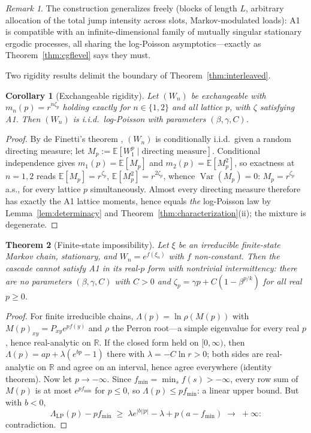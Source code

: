 \documentclass[12pt]{amsart}
\newtheorem{theorem}{Theorem}
\newtheorem{corollary}[theorem]{Corollary}
\theoremstyle{definition}
\theoremstyle{remark}
\newtheorem*{remark}{Remark}
\DeclareMathOperator{\Var}{Var}
\begin{document}
\begin{remark}
The construction generalizes freely (blocks of length $L$, arbitrary
allocation of the total jump intensity across slots,
Markov-modulated loads): A1 is compatible with an
infinite-dimensional family of mutually singular stationary ergodic
processes, all sharing the log-Poisson asymptotics---exactly as
Theorem~\ref{thm:cgflevel} says they must.
\end{remark}

Two rigidity results delimit the boundary of
Theorem~\ref{thm:interleaved}.

\begin{corollary}[Exchangeable rigidity]\label{cor:exch}
Let $(W_n)$ be exchangeable with $m_n(p) = r^{n\zeta_p}$ holding
exactly for $n \in \{1,2\}$ and all lattice $p$, with $\zeta$
satisfying A1.  Then $(W_n)$ is i.i.d.\ log-Poisson with parameters
$(\beta, \gamma, C)$.
\end{corollary}

\begin{proof}
By de Finetti's theorem \cite{Kal02}, $(W_n)$ is conditionally
i.i.d.\ given a random directing measure; let $M_p :=
\mathbb{E}[W_1^p \mid \text{directing measure}]$.  Conditional
independence gives $m_1(p) = \mathbb{E}[M_p]$ and $m_2(p) =
\mathbb{E}[M_p^2]$, so exactness at $n = 1,2$ reads
$\mathbb{E}[M_p] = r^{\zeta_p}$, $\mathbb{E}[M_p^2] =
r^{2\zeta_p}$, whence $\Var(M_p) = 0$: $M_p = r^{\zeta_p}$ a.s., for
every lattice $p$ simultaneously.  Almost every directing measure
therefore has exactly the A1 lattice moments, hence equals
\emph{the} log-Poisson law by Lemma~\ref{lem:determinacy} and
Theorem~\ref{thm:characterization}(ii); the mixture is degenerate.
\end{proof}

\begin{theorem}[Finite-state impossibility]\label{thm:finitestate}
Let $\xi$ be an irreducible finite-state Markov chain, stationary,
and $W_n = e^{f(\xi_n)}$ with $f$ non-constant.  Then the cascade
cannot satisfy A1 in its real-$p$ form with nontrivial
intermittency: there are no parameters $(\beta, \gamma, C)$ with
$C > 0$ and $\zeta_p = \gamma p + C(1-\beta^{p/k})$ for all real
$p \ge 0$.
\end{theorem}

\begin{proof}
For finite irreducible chains, $\Lambda(p) = \ln\rho(M(p))$ with
$M(p)_{xy} = P_{xy}e^{pf(y)}$ and $\rho$ the Perron root---a simple
eigenvalue for every real $p$, hence real-analytic on $\mathbb{R}$.
If the closed form held on $[0,\infty)$, then $\Lambda(p) = ap +
\lambda(e^{bp}-1)$ there with $\lambda = -C\ln r > 0$; both sides
are real-analytic on $\mathbb{R}$ and agree on an interval, hence
agree everywhere (identity theorem).  Now let $p \to -\infty$.
Since $f_{\min} = \min_s f(s) > -\infty$, every row sum of $M(p)$
is at most $e^{pf_{\min}}$ for $p \le 0$, so $\Lambda(p) \le
pf_{\min}$: a linear upper bound.  But with $b < 0$,
\[
  \Lambda_{\mathrm{LP}}(p) - pf_{\min}
  \;\ge\; \lambda e^{|b||p|} - \lambda + p(a - f_{\min})
  \;\longrightarrow\; +\infty :
\]
contradiction.
\end{proof}
\end{document}
